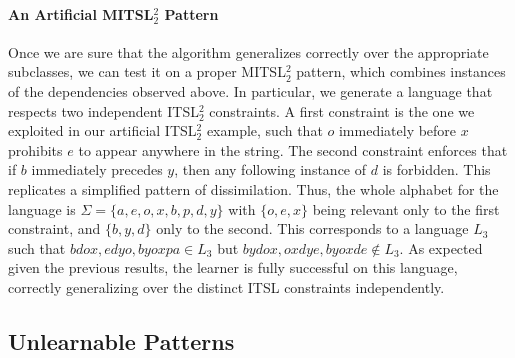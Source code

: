 \documentclass[11pt,a4paper]{article}
\begin{document}
\paragraph{An Artificial MITSL$^2_2$ Pattern}

Once we are sure that the algorithm generalizes correctly over the appropriate subclasses, we can test it on a proper MITSL$^2_2$ pattern, which combines instances of the dependencies observed above.
In particular, we generate a language that respects two independent  ITSL$^2_2$ constraints. 
A first constraint is the one we exploited in our artificial  ITSL$^2_2$ example, such that $o$ immediately before $x$ prohibits $e$ to appear anywhere in the string.
The second constraint enforces that if $b$ immediately precedes $y$, then any following instance of $d$ is forbidden.
This replicates a simplified pattern of dissimilation.
Thus, the whole alphabet for the language is $\Sigma = \{a, e, o, x, b, p, d, y\}$ with  $ \{o, e, x\}$ being relevant only to the first constraint, and $ \{b, y, d\}$ only to the second.
This corresponds to a language $L_3$ such that $bdox,edyo,byoxpa \in L_3$ but $bydox,oxdye,byoxde \notin L_3$.
As expected given the previous results, the learner is fully successful on this language, correctly generalizing over the distinct ITSL constraints independently.

\subsection{Unlearnable Patterns}
\label{ssec:limits}
\end{document}
